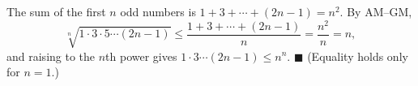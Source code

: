 The sum of the first $n$ odd numbers is $1+3+\cdots+(2n-1)=n^2$. By AM--GM,
\[\sqrt[n]{1\cdot3\cdot5\cdots(2n-1)}\le\dfrac{1+3+\cdots+(2n-1)}{n}=\dfrac{n^2}{n}=n,\]
and raising to the $n$th power gives $1\cdot3\cdots(2n-1)\le n^n$. $\blacksquare$ (Equality holds only for $n=1$.)
